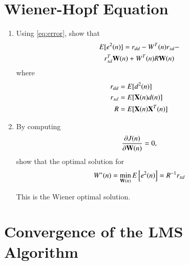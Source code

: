 \documentclass[journal,12pt,twocolumn]{IEEEtran}
\renewcommand\thesection{\arabic{section}}
\begin{document}
\section{Wiener-Hopf Equation}
\begin{enumerate}[label=\thesection.\arabic*
,ref=\thesection.\theenumi]

\item Using \eqref{eq:error}, 
%
show that
\begin{multline}
E[e^{2}(n)] = r_{dd} - W^{T}(n)r_{xd} - 
\\
r^{T}_{xd}\mathbf{W}(n) + W^{T}(n) R \mathbf{W}(n)
\end{multline}
where
\begin{align}
r_{dd} &= E[d^2(n)]
\\
r_{xd} &= E[\mathbf{X}(n)d(n)]
\\
R &= E[\mathbf{X}(n)\mathbf{X}^{T}(n)]
\label{eq:matrix_R}
\end{align}

%
\item
By computing 
\begin{equation}
\frac{\partial J(n)}{\partial \mathbf{W}(n)}=0,
\end{equation}
show that the optimal solution for
%
\begin{equation}
\label{eq:wiener_opt}
W^*(n) = \min_{\mathbf{W}(n)}E{}\left[e^2(n)\right] = R^{-1} r_{xd}
\end{equation}
%

This is the Wiener optimal solution.
\end{enumerate}
\section{Convergence of the LMS Algorithm}
\end{document}

